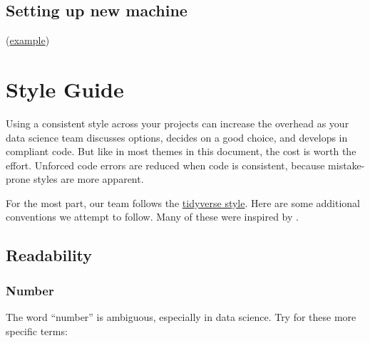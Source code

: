 \documentclass[
]{book}
\begin{document}
\hypertarget{setting-up-new-machine}{%
\section{Setting up new machine}\label{setting-up-new-machine}}

(\href{https://github.com/OuhscBbmc/RedcapExamplesAndPatterns/blob/master/DocumentationGlobal/ResourcesInstallation.md}{example})

\hypertarget{style}{%
\chapter{Style Guide}\label{style}}

Using a consistent style across your projects can increase the overhead as your data science team discusses options, decides on a good choice, and develops in compliant code. But like in most themes in this document, the cost is worth the effort. Unforced code errors are reduced when code is consistent, because mistake-prone styles are more apparent.

For the most part, our team follows the \href{https://style.tidyverse.org/}{tidyverse style}. Here are some additional conventions we attempt to follow. Many of these were inspired by \citep{balena-dimauro}.

\hypertarget{readability}{%
\section{Readability}\label{readability}}

\hypertarget{style-number}{%
\subsection{Number}\label{style-number}}

The word ``number'' is ambiguous, especially in data science. Try for these more specific terms:
\end{document}
